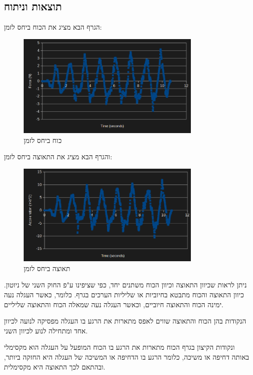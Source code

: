 \documentclass[14pt]{extarticle}
\begin{document}
\subsection*{תוצאות וניתוח}
הגרף הבא מציג את הכוח ביחס לזמן:
\begin{figure}[H]
    \centering
    \includegraphics[width=0.8\textwidth]{maman_13_experiment_3_force_to_time.png}
    \caption{כוח ביחס לזמן}
\end{figure}
והגרף הבא מציג את התאוצה ביחס לזמן:
\begin{figure}[H]
    \centering
    \includegraphics[width=0.8\textwidth]{maman_13_experiment_3_acceleration_to_time.png}
    \caption{תאוצה ביחס לזמן}
\end{figure}

ניתן לראות שכיוון התאוצה וכיוון הכוח משתנים יחד, כפי שציפינו ע"פ החוק השני של ניוטון.
כיוון התאוצה והכוח מתבטא בחיוביות או שליליות הערכים בגרף. כלומר, כאשר העגלה נעה ימינה הכוח והתאוצה חיוביים, וכאשר העגלה נעה שמאלה הכוח והתאוצה שליליים.

הנקודות בהן הכוח והתאוצה שווים לאפס מתארות את הרגע בו העגלה מפסיקה לנועה  לכיוון אחד ומתחילה לנוע לכיוון השני.

ונקודות הקיצון בגרף הכוח מתארות את הרגע בו הכוח המופעל על העגלה הוא מקסימלי באותה דחיפה או משיכה, כלומר הרגע בו הדחיפה או המשיכה של העגלה היא החזקה ביותר, ובהתאם לכך התאוצה היא מקסימלית.
\end{document}
